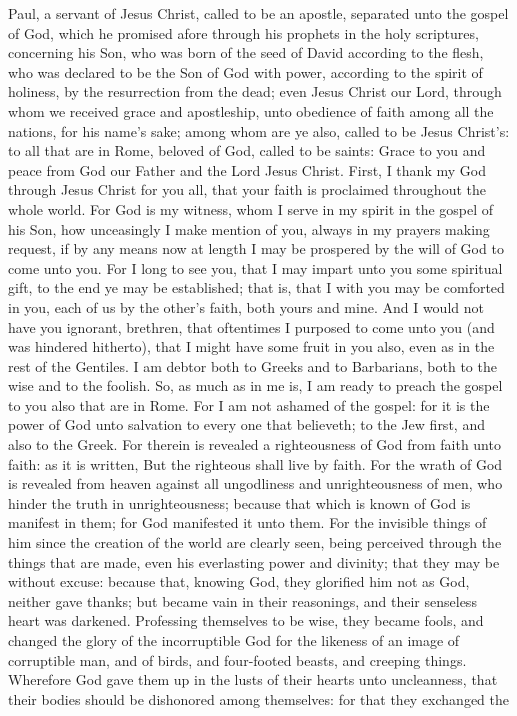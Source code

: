 


Paul, a servant of Jesus Christ, called to be an apostle, separated unto the gospel of God, which he promised afore through his prophets in the holy scriptures, concerning his Son, who was born of the seed of David according to the flesh, who was declared to be the Son of God with power, according to the spirit of holiness, by the resurrection from the dead; even Jesus Christ our Lord, through whom we received grace and apostleship, unto obedience of faith among all the nations, for his name’s sake; among whom are ye also, called to be Jesus Christ’s: to all that are in Rome, beloved of God, called to be saints: Grace to you and peace from God our Father and the Lord Jesus Christ.  First, I thank my God through Jesus Christ for you all, that your faith is proclaimed throughout the whole world. For God is my witness, whom I serve in my spirit in the gospel of his Son, how unceasingly I make mention of you, always in my prayers making request, if by any means now at length I may be prospered by the will of God to come unto you. For I long to see you, that I may impart unto you some spiritual gift, to the end ye may be established; that is, that I with you may be comforted in you, each of us by the other’s faith, both yours and mine. And I would not have you ignorant, brethren, that oftentimes I purposed to come unto you (and was hindered hitherto), that I might have some fruit in you also, even as in the rest of the Gentiles. I am debtor both to Greeks and to Barbarians, both to the wise and to the foolish. So, as much as in me is, I am ready to preach the gospel to you also that are in Rome.  For I am not ashamed of the gospel: for it is the power of God unto salvation to every one that believeth; to the Jew first, and also to the Greek. For therein is revealed a righteousness of God from faith unto faith: as it is written, But the righteous shall live by faith.  For the wrath of God is revealed from heaven against all ungodliness and unrighteousness of men, who hinder the truth in unrighteousness; because that which is known of God is manifest in them; for God manifested it unto them. For the invisible things of him since the creation of the world are clearly seen, being perceived through the things that are made, even his everlasting power and divinity; that they may be without excuse: because that, knowing God, they glorified him not as God, neither gave thanks; but became vain in their reasonings, and their senseless heart was darkened. Professing themselves to be wise, they became fools, and changed the glory of the incorruptible God for the likeness of an image of corruptible man, and of birds, and four-footed beasts, and creeping things.  Wherefore God gave them up in the lusts of their hearts unto uncleanness, that their bodies should be dishonored among themselves: for that they exchanged the 